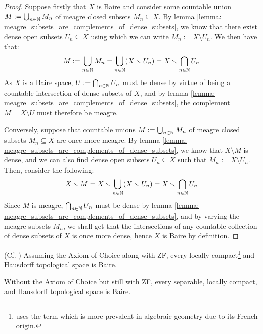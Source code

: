             \begin{proof}
                Suppose firstly that $X$ is Baire and consider some countable union $M := \bigcup_{n \in \mathbb{N}} M_n$ of meagre closed subsets $M_n \subseteq X$. By lemma \ref{lemma: meagre_subsets_are_complements_of_dense_subsets}, we know that there exist dense open subsets $U_n \subseteq X$ using which we can write $M_n := X \setminus U_n$. We then have that:
                    $$M := \bigcup_{n \in \mathbb{N}} M_n = \bigcup_{n \in \mathbb{N}} (X \smallsetminus U_n) = X \smallsetminus \bigcap_{n \in \mathbb{N}} U_n$$
                As $X$ is a Baire space, $U := \bigcap_{n \in \mathbb{N}} U_n$ must be dense by virtue of being a countable intersection of dense subsets of $X$, and by lemma \ref{lemma: meagre_subsets_are_complements_of_dense_subsets}, the complement $M = X \setminus U$ must therefore be meagre.

                Conversely, suppose that countable unions $M := \bigcup_{n \in \mathbb{N}} M_n$ of meagre closed subsets $M_n \subseteq X$ are once more meagre. By lemma \ref{lemma: meagre_subsets_are_complements_of_dense_subsets}, we know that $X \setminus M$ is dense, and we can also find dense open subsets $U_n \subseteq X$ such that $M_n := X \setminus U_n$. Then, consider the following:
                    $$X \smallsetminus M = X \smallsetminus \bigcup_{n \in \mathbb{N}} (X \smallsetminus U_n) = X \smallsetminus \bigcap_{n \in \mathbb{N}} U_n$$
                Since $M$ is meagre, $\bigcap_{n \in \mathbb{N}} U_n$ must be dense by lemma \ref{lemma: meagre_subsets_are_complements_of_dense_subsets}, and by varying the meagre subsets $M_n$, we shall get that the intersections of any countable collection of dense subsets of $X$ is once more dense, hence $X$ is Baire by definition.
            \end{proof}
        \begin{theorem} \label{theorem: baire_category}
            (Cf. \cite[\href{https://stacks.math.columbia.edu/tag/0CQN}{Tag 0CQN}]{stacks}) Assuming the Axiom of Choice along with ZF, every locally compact\footnote{\cite{stacks} uses the term  which is more prevalent in algebraic geometry due to its French origin.} and Hausdorff topological space is Baire.
            
            Without the Axiom of Choice but still with ZF, every \underline{separable}, locally compact, and Hausdorff topological space is Baire.
        \end{theorem}
